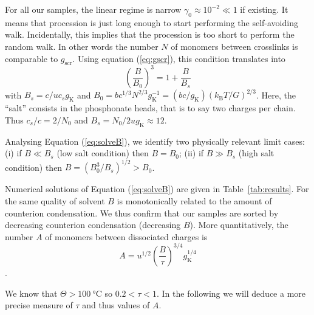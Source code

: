 \documentclass[journal=jacsat,manuscript=article]{achemso}
\begin{document}
For all our samples, the linear regime is narrow $\gamma_0\approx 10^{-2}\ll 1$ if existing. It means that procession is just long enough to start performing the self-avoiding walk. Incidentally, this implies that the procession is too short to perform the random walk. In other words the number $N$ of monomers between crosslinks is comparable to $g_\mathrm{scr}$. Using equation (\ref{eq:gscr}), this condition translates into
\begin{equation}
\left(\frac{B}{B_0}\right)^3 = 1 + \frac{B}{B_s}
\label{eq:solveB}
\end{equation}
with $B_s = c/u c_s g_\mathrm{K}$ and $B_0 = b c^{1/3} N^{2/3} g_\mathrm{K}^{-1} = (bc/g_\mathrm{K}) \left(k_\mathrm{B}T/G\right)^{2/3}$. Here, the ``salt'' consists in the phosphonate heads, that is to say two charges per chain. Thus $c_s/c = 2/N_0$ and $B_s = N_0/2u g_\mathrm{K} \approx 12$.

Analysing Equation (\ref{eq:solveB}), we identify two physically relevant limit cases: (i) if $B \ll B_s$ (low salt condition) then $B = B_0$; (ii) if $B \gg B_s$ (high salt condition) then $B = \left(B_0^3/B_s\right)^{1/2} > B_0$.

Numerical solutions of Equation (\ref{eq:solveB}) are given in Table~\ref{tab:results}. For the same quality of solvent $B$ is monotonically related to the amount of counterion condensation. We thus confirm that our samples are sorted by decreasing counterion condensation (decreasing $B$). More quantitatively, the number $A$ of monomers between dissociated charges is
\begin{equation}
A = u^{1/2} \left(\frac{B}{\tau}\right)^{3/4} g_\mathrm{K}^{1/4}
\label{eq:A}
\end{equation}.

We know that $\Theta>\SI{100}{\celsius}$ so $0.2<\tau<1$. In the following we will deduce a more precise measure of $\tau$ and thus values of $A$.


%
\end{document}
